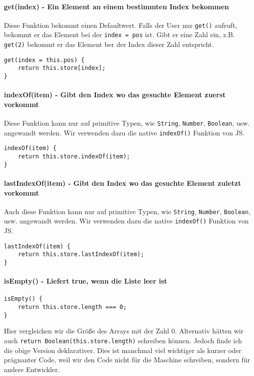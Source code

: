 \documentclass{book}
\begin{document}
\paragraph{get(index) - Ein Element an einem bestimmten Index bekommen}
Diese Funktion bekommt einen Defaultwert. Falls der User nur \lstinline|get()| aufruft, bekommt er das Element bei der \lstinline|index = pos| ist. Gibt er eine Zahl ein, z.B. \lstinline|get(2)| bekommt er das Element ber der Index dieser Zahl entspricht.
\begin{lstlisting}[caption=Array Konstruktor]
get(index = this.pos) {
	return this.store[index];
}
\end{lstlisting}

\paragraph{indexOf(item) - Gibt den Index wo das gesuchte Element zuerst vorkommt} Diese Funktion kann nur auf primitive Typen, wie \lstinline|String|, \lstinline|Number|, \lstinline|Boolean|, usw. angewandt werden. Wir verwenden dazu die native \lstinline|indexOf()| Funktion von JS.
\begin{lstlisting}[caption=Array Konstruktor]
indexOf(item) {
	return this.store.indexOf(item);
}
\end{lstlisting}

\paragraph{lastIndexOf(item) - Gibt den Index wo das gesuchte Element zuletzt vorkommt} Auch diese Funktion kann nur auf primitive Typen, wie \lstinline|String|, \lstinline|Number|, \lstinline|Boolean|, usw. angewandt werden. Wir verwenden dazu die native \mbox{\lstinline|indexOf()|} Funktion von JS.
\begin{lstlisting}[caption=Array Konstruktor]
lastIndexOf(item) {
	return this.store.lastIndexOf(item);
}
\end{lstlisting}

\paragraph{isEmpty() - Liefert true, wenn die Liste leer ist} 
\begin{lstlisting}[caption=Array Konstruktor]
isEmpty() {
	return this.store.length === 0;
}
\end{lstlisting}
Hier vergleichen wir die Größe des Arrays mit der Zahl 0. Alternativ hätten wir auch \lstinline|return Boolean(this.store.length)| schreiben können. Jedoch finde ich die obige Version deklarativer. Dies ist manchmal viel wichtiger als kurzer oder prägnanter Code, weil wir den Code nicht für die Maschine schreiben, sondern für andere Entwickler.
\end{document}
